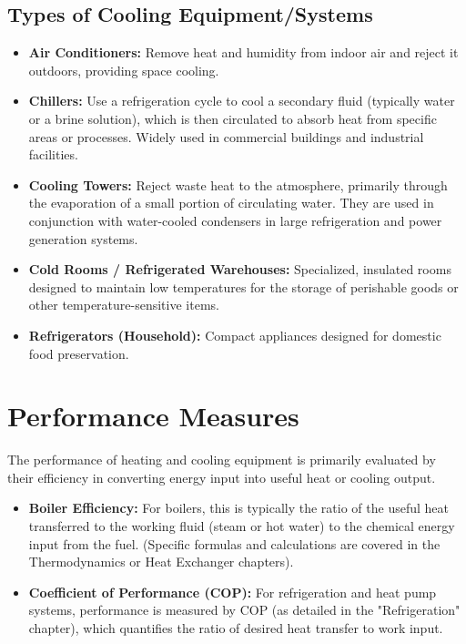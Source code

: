 \subsection{Types of Cooling Equipment/Systems}
\begin{itemize}
    \item \textbf{Air Conditioners:} Remove heat and humidity from indoor air and reject it outdoors, providing space cooling.
    \item \textbf{Chillers:} Use a refrigeration cycle to cool a secondary fluid (typically water or a brine solution), which is then circulated to absorb heat from specific areas or processes. Widely used in commercial buildings and industrial facilities.
    \item \textbf{Cooling Towers:} Reject waste heat to the atmosphere, primarily through the evaporation of a small portion of circulating water. They are used in conjunction with water-cooled condensers in large refrigeration and power generation systems.
    \item \textbf{Cold Rooms / Refrigerated Warehouses:} Specialized, insulated rooms designed to maintain low temperatures for the storage of perishable goods or other temperature-sensitive items.
    \item \textbf{Refrigerators (Household):} Compact appliances designed for domestic food preservation.
\end{itemize}

\section{Performance Measures}
The performance of heating and cooling equipment is primarily evaluated by their efficiency in converting energy input into useful heat or cooling output.
\begin{itemize}
    \item \textbf{Boiler Efficiency:} For boilers, this is typically the ratio of the useful heat transferred to the working fluid (steam or hot water) to the chemical energy input from the fuel. (Specific formulas and calculations are covered in the Thermodynamics or Heat Exchanger chapters).
    \item \textbf{Coefficient of Performance (COP):} For refrigeration and heat pump systems, performance is measured by COP (as detailed in the "Refrigeration" chapter), which quantifies the ratio of desired heat transfer to work input.
\end{itemize}

